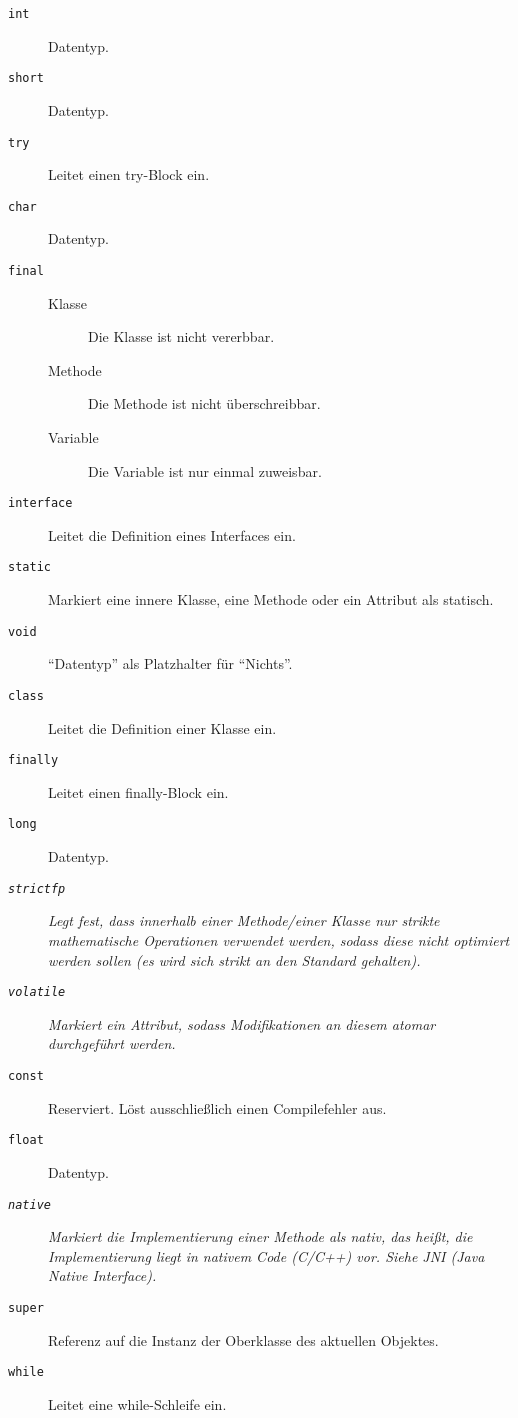 \begin{description}
\begin{description}
	        \end{description}
        \item[\texttt{int}] Datentyp.
        \item[\texttt{short}] Datentyp.
        \item[\texttt{try}] Leitet einen try-Block ein.
        \item[\texttt{char}] Datentyp.
        \item[\texttt{final}]
	        \begin{description}
	        	\item[Klasse] Die Klasse ist nicht vererbbar.
	        	\item[Methode] Die Methode ist nicht überschreibbar.
	        	\item[Variable] Die Variable ist nur einmal zuweisbar.
	        \end{description}
        \item[\texttt{interface}] Leitet die Definition eines Interfaces ein.
        \item[\texttt{static}] Markiert eine innere Klasse, eine Methode oder ein Attribut als statisch.
        \item[\texttt{void}] \enquote{Datentyp} als Platzhalter für \enquote{Nichts}.
        \item[\texttt{class}] Leitet die Definition einer Klasse ein.
        \item[\texttt{finally}] Leitet einen finally-Block ein.
        \item[\texttt{long}] Datentyp.
        \item[\textit{\texttt{strictfp}}] \textit{Legt fest, dass innerhalb einer Methode/einer Klasse nur strikte mathematische Operationen verwendet werden, sodass diese nicht optimiert werden sollen (es wird sich strikt an den Standard gehalten).}
        \item[\textit{\texttt{volatile}}] \textit{Markiert ein Attribut, sodass Modifikationen an diesem atomar durchgeführt werden.}
        \item[\texttt{const}] Reserviert. Löst ausschließlich einen Compilefehler aus.
        \item[\texttt{float}] Datentyp.
        \item[\textit{\texttt{native}}] \textit{Markiert die Implementierung einer Methode als nativ, das heißt, die Implementierung liegt in nativem Code (C/C++) vor. Siehe JNI (Java Native Interface).}
        \item[\texttt{super}] Referenz auf die Instanz der Oberklasse des aktuellen Objektes.
        \item[\texttt{while}] Leitet eine while-Schleife ein.
	\end{description}
	
